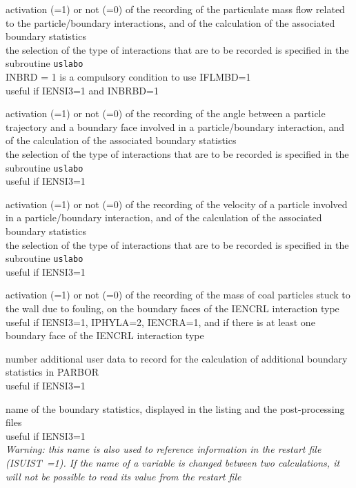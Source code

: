 {activation (=1) or not (=0) of the recording of the particulate mass flow
related to the particle/boundary interactions, and of the calculation of
the associated boundary statistics\\ 
the selection of the type of interactions that are to be recorded is specified
in the subroutine \texttt{uslabo}\\
INBRD = 1 is a compulsory condition to use IFLMBD=1\\
useful if IENSI3=1 and INBRBD=1}


{activation (=1) or not (=0) of the recording of the angle between a
particle trajectory and a boundary face involved in a particle/boundary
interaction, and of the calculation of the associated boundary statistics\\ 
the selection of the type of interactions that are to be recorded is specified
in the subroutine \texttt{uslabo}\\
useful if IENSI3=1}

{activation (=1) or not (=0) of the recording of the velocity of a particle
involved in a particle/boundary interaction, and of the calculation of
the associated boundary statistics\\
the selection of the type of interactions that are to be recorded is specified
in the subroutine \texttt{uslabo}\\
useful if IENSI3=1}

{activation (=1) or not (=0) of the recording of the mass of coal particles
stuck to the wall due to fouling, on the boundary faces of the IENCRL
interaction type\\
useful if IENSI3=1, IPHYLA=2,
IENCRA=1, and if there is at least one boundary face of the IENCRL interaction
type}

{number additional user data to record for the calculation
of additional boundary statistics in PARBOR\\ 
useful if IENSI3=1}

{name of the boundary statistics, displayed in the listing
and the post-processing files\\
useful if IENSI3=1\\
{\em Warning: this name is also used to reference information in the restart file
\mbox{(ISUIST =1)}. If the name of a variable is changed between two
calculations, it will not be possible to read its value from the restart file}}

